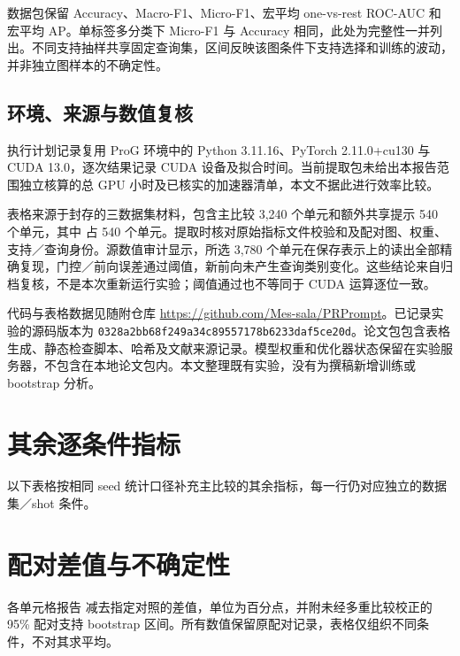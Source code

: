 数据包保留 Accuracy、Macro-F1、Micro-F1、宏平均 one-vs-rest ROC-AUC 和宏平均 AP。单标签多分类下 Micro-F1 与 Accuracy 相同，此处为完整性一并列出。不同支持抽样共享固定查询集，区间反映该图条件下支持选择和训练的波动，并非独立图样本的不确定性。

\subsection{环境、来源与数值复核}
执行计划记录复用 ProG 环境中的 Python 3.11.16、PyTorch 2.11.0+cu130 与 CUDA 13.0，逐次结果记录 CUDA 设备及拟合时间。当前提取包未给出本报告范围独立核算的总 GPU 小时及已核实的加速器清单，本文不据此进行效率比较。

表格来源于封存的三数据集材料，包含主比较 3,240 个单元和额外共享提示 540 个单元，其中 \method 占 540 个单元。提取时核对原始指标文件校验和及配对图、权重、支持／查询身份。源数值审计显示，所选 3,780 个单元在保存表示上的读出全部精确复现，门控／前向误差通过阈值，新前向未产生查询类别变化。这些结论来自归档复核，不是本次重新运行实验；阈值通过也不等同于 CUDA 运算逐位一致。

代码与表格数据见随附仓库 \url{https://github.com/Mes-sala/PRPrompt}。已记录实验的源码版本为 \texttt{0328a2bb68\allowbreak f249a34c89\allowbreak 557178b623\allowbreak 3daf5ce20d}。论文包包含表格生成、静态检查脚本、哈希及文献来源记录。模型权重和优化器状态保留在实验服务器，不包含在本地论文包内。本文整理既有实验，没有为撰稿新增训练或 bootstrap 分析。

\clearpage
\section{其余逐条件指标}
\label{app:more}
以下表格按相同 seed 统计口径补充主比较的其余指标，每一行仍对应独立的数据集／shot 条件。



\clearpage
\section{配对差值与不确定性}
\label{app:paired}
各单元格报告 \method 减去指定对照的差值，单位为百分点，并附未经多重比较校正的 95\% 配对支持 bootstrap 区间。所有数值保留原配对记录，表格仅组织不同条件，不对其求平均。

